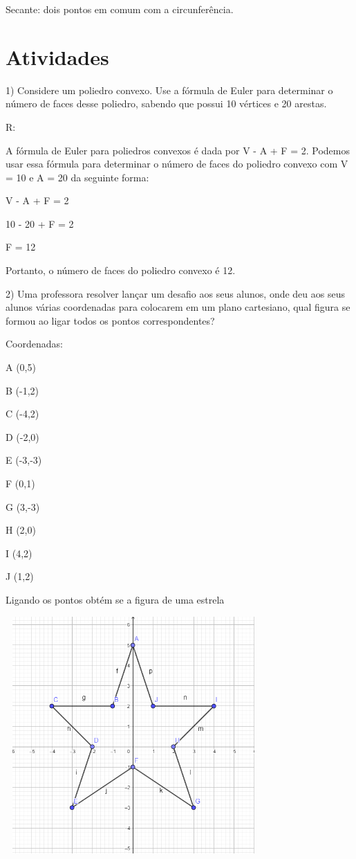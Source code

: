 Secante: dois pontos em comum com a circunferência.

\section{Atividades}

1) Considere um poliedro convexo. Use a fórmula de Euler para determinar
o número de faces desse poliedro, sabendo que possui 10 vértices e 20
arestas.

R:

A fórmula de Euler para poliedros convexos é dada por V - A + F = 2.
Podemos usar essa fórmula para determinar o número de faces do poliedro
convexo com V = 10 e A = 20 da seguinte forma:

V - A + F = 2

10 - 20 + F = 2

F = 12

Portanto, o número de faces do poliedro convexo é 12.

2) Uma professora resolver lançar um desafio aos seus alunos, onde deu
aos seus alunos várias coordenadas para colocarem em um plano
cartesiano, qual figura se formou ao ligar todos os pontos
correspondentes?

Coordenadas:

A (0,5)

B (-1,2)

C (-4,2)

D (-2,0)

E (-3,-3)

F (0,1)

G (3,-3)

H (2,0)

I (4,2)

J (1,2)

Ligando os pontos obtém se a figura de uma estrela

\includegraphics[width=3.85417in,height=3.56597in]{./imgSAEB_6_MAT/media/image45.png}

